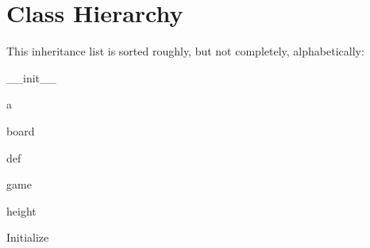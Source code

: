 \section{Class Hierarchy}
This inheritance list is sorted roughly, but not completely, alphabetically\+:\begin{DoxyCompactList}
\item \+\_\+\+\_\+init\+\_\+\+\_\+\begin{DoxyCompactList}
\item {}
\end{DoxyCompactList}
\item a\begin{DoxyCompactList}
\item {}
\end{DoxyCompactList}
\item board\begin{DoxyCompactList}
\item {}
\end{DoxyCompactList}
\item def\begin{DoxyCompactList}
\item {}
\end{DoxyCompactList}
\item game\begin{DoxyCompactList}
\item {}
\end{DoxyCompactList}
\item height\begin{DoxyCompactList}
\item {}
\end{DoxyCompactList}
\item Initialize\begin{DoxyCompactList}
\item {}
\end{DoxyCompactList}
\item {}

\end{DoxyCompactList}
